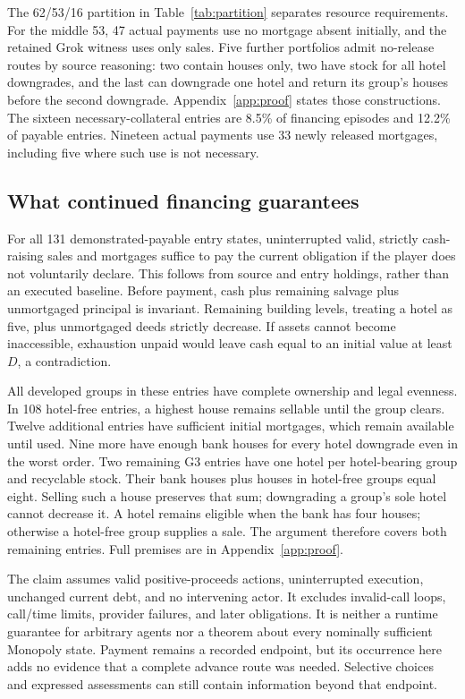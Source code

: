 The 62/53/16 partition in Table~\ref{tab:partition} separates resource requirements. For the middle 53, 47 actual payments use no mortgage absent initially, and the retained Grok witness uses only sales. Five further portfolios admit no-release routes by source reasoning: two contain houses only, two have stock for all hotel downgrades, and the last can downgrade one hotel and return its group's houses before the second downgrade. Appendix~\ref{app:proof} states those constructions. The sixteen necessary-collateral entries are 8.5\% of financing episodes and 12.2\% of payable entries. Nineteen actual payments use 33 newly released mortgages, including five where such use is not necessary.

\subsection{What continued financing guarantees}
\label{sec:continuation}

For all 131 demonstrated-payable entry states, uninterrupted valid, strictly cash-raising sales and mortgages suffice to pay the current obligation if the player does not voluntarily declare. This follows from source and entry holdings, rather than an executed baseline. Before payment, cash plus remaining salvage plus unmortgaged principal is invariant. Remaining building levels, treating a hotel as five, plus unmortgaged deeds strictly decrease. If assets cannot become inaccessible, exhaustion unpaid would leave cash equal to an initial value at least $D$, a contradiction.

All developed groups in these entries have complete ownership and legal evenness. In 108 hotel-free entries, a highest house remains sellable until the group clears. Twelve additional entries have sufficient initial mortgages, which remain available until used. Nine more have enough bank houses for every hotel downgrade even in the worst order. Two remaining G3 entries have one hotel per hotel-bearing group and recyclable stock. Their bank houses plus houses in hotel-free groups equal eight. Selling such a house preserves that sum; downgrading a group's sole hotel cannot decrease it. A hotel remains eligible when the bank has four houses; otherwise a hotel-free group supplies a sale. The argument therefore covers both remaining entries. Full premises are in Appendix~\ref{app:proof}.

The claim assumes valid positive-proceeds actions, uninterrupted execution, unchanged current debt, and no intervening actor. It excludes invalid-call loops, call/time limits, provider failures, and later obligations. It is neither a runtime guarantee for arbitrary agents nor a theorem about every nominally sufficient Monopoly state. Payment remains a recorded endpoint, but its occurrence here adds no evidence that a complete advance route was needed. Selective choices and expressed assessments can still contain information beyond that endpoint.

